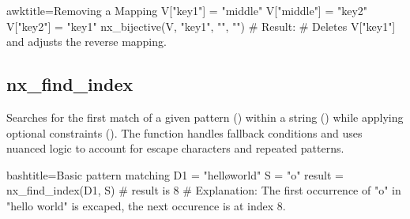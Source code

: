 \begin{NexCodeBox}{awk}{title={Removing a Mapping}}
	V["key1"] = "middle"
	V["middle"] = "key2"
	V["key2"] = "key1"
	nx_bijective(V, "key1", "", "")
	# Result:
	# Deletes V["key1"] and adjusts the reverse mapping.
\end{NexCodeBox}

\newpage
\subsection{nx_find_index}
\label{nx_find_index}

\begin{NexMainBox}
	\begin{NexMainBox}
		Searches for the first match of a given pattern () within a string () while applying optional constraints (). The function handles fallback conditions and uses nuanced logic to account for escape characters and repeated patterns.
	\end{NexMainBox}
	\begin{NexMainBox}
		\begin{NexListDark}
		\end{NexListDark}
	\end{NexMainBox}
\end{NexMainBox}

\begin{NexCodeBox}{bash}{title={Basic pattern matching}}
	D1 = "hell\o world"
	S = "o"
	result = nx_find_index(D1, S)
	# result is 8
	# Explanation: The first occurrence of "o" in "hello world" is excaped, the next occurence is at index 8.
\end{NexCodeBox}

